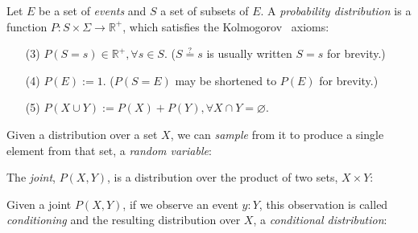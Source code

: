 \documentclass[11pt]{article}
\begin{document}
    \noindent Let $E$ be a set of \textit{events} and $S$ a set of subsets of $E$. A \textit{probability distribution} is a function $P: S \times \Sigma \rightarrow \mathbb{R}^{+}$, which satisfies the Kolmogorov~\cite{kolmogorov1933grundbegriffe} axioms:

    \begin{itemize}
        \itemsep-1em
        \item [(3)] $P(S = s) \in \mathbb{R}^{+}, \forall s \in S$. ($S \overset{?}{=} s$ is usually written $S = s$ for brevity.) \\
        \item [(4)] $P(E) := 1$. ($P(S = E)$ may be shortened to $P(E)$ for brevity.) \\
        \item [(5)] $P(X \cup Y) := P(X) + P(Y), \forall X \cap Y = \varnothing$.
    \end{itemize}

    \noindent Given a distribution over a set $X$, we can \textit{sample} from it to produce a single element from that set, a \textit{random variable}:

\begin{prooftree}
\end{prooftree}

%

\noindent The \textit{joint}, $P(X, Y)$, is a distribution over the product of two sets, $X \times Y$:

\begin{prooftree}
\end{prooftree}

\noindent Given a joint $P(X, Y)$, if we observe an event $y: Y$, this observation is called \textit{conditioning} and the resulting distribution over $X$, a \textit{conditional distribution}:
\end{document}

